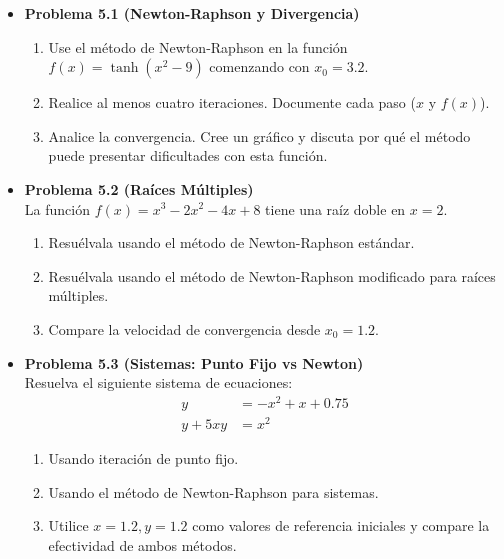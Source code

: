 \documentclass[12pt,letterpaper]{article}
\begin{document}
\begin{itemize}

    \item \textbf{Problema 5.1 (Newton-Raphson y Divergencia)}
    \begin{enumerate}
        \item Use el método de Newton-Raphson en la función $f(x) = \tanh(x^2 - 9)$ comenzando con $x_0 = 3.2$.
        \item Realice al menos cuatro iteraciones. Documente cada paso ($x$ y $f(x)$).
        \item Analice la convergencia. Cree un gráfico y discuta por qué el método puede presentar dificultades con esta función.
    \end{enumerate}

    \vspace{0.3cm}
    \item \textbf{Problema 5.2 (Raíces Múltiples)} \\
    La función $f(x) = x^3 - 2x^2 - 4x + 8$ tiene una raíz doble en $x = 2$.
    \begin{enumerate}
        \item Resuélvala usando el método de Newton-Raphson estándar.
        \item Resuélvala usando el método de Newton-Raphson modificado para raíces múltiples.
        \item Compare la velocidad de convergencia desde $x_0 = 1.2$.
    \end{enumerate}

    \vspace{0.3cm}
    \item \textbf{Problema 5.3 (Sistemas: Punto Fijo vs Newton)} \\
    Resuelva el siguiente sistema de ecuaciones:
    \begin{align*}
        y &= -x^2 + x + 0.75 \\
        y + 5xy &= x^2
    \end{align*}
    \begin{enumerate}
        \item Usando iteración de punto fijo.
        \item Usando el método de Newton-Raphson para sistemas.
        \item Utilice $x = 1.2, y = 1.2$ como valores de referencia iniciales y compare la efectividad de ambos métodos.
    \end{enumerate}


\end{itemize}
\end{document}
